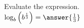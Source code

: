 \documentclass{ximera}
\author{David Kish}
\begin{document}
\begin{exercise}
Evaluate the expression.\\
$\log_b \left(b^{\frac{1}{3}}\right)= \answer{\frac{1}{3}}$
\end{exercise}
\end{document}
